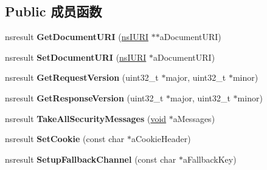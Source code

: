 \subsection*{Public 成员函数}
\begin{DoxyCompactItemize}
\item 
\mbox{\label{interfacens_i_http_channel_internal_a9989cd43cb825606751b36b1362e5ace}} 
nsresult {\bfseries Get\+Document\+U\+RI} (\hyperlink{interfacens_i_u_r_i}{ns\+I\+U\+RI} $\ast$$\ast$a\+Document\+U\+RI)
\item 
\mbox{\label{interfacens_i_http_channel_internal_a562c587c8c03b6ae214c99d3ec395212}} 
nsresult {\bfseries Set\+Document\+U\+RI} (\hyperlink{interfacens_i_u_r_i}{ns\+I\+U\+RI} $\ast$a\+Document\+U\+RI)
\item 
\mbox{\label{interfacens_i_http_channel_internal_a8a24a622ecc3d2dfa5dea63410b54fc1}} 
nsresult {\bfseries Get\+Request\+Version} (uint32\+\_\+t $\ast$major, uint32\+\_\+t $\ast$minor)
\item 
\mbox{\label{interfacens_i_http_channel_internal_a062ac7828898dd7a724ef81317a32847}} 
nsresult {\bfseries Get\+Response\+Version} (uint32\+\_\+t $\ast$major, uint32\+\_\+t $\ast$minor)
\item 
\mbox{\label{interfacens_i_http_channel_internal_a6000ec4f30903ac8fe3e17110a44a743}} 
nsresult {\bfseries Take\+All\+Security\+Messages} (\hyperlink{interfacevoid}{void} $\ast$a\+Messages)
\item 
\mbox{\label{interfacens_i_http_channel_internal_a51ebd08a39913f932c9dd7ab2e1fe9ab}} 
nsresult {\bfseries Set\+Cookie} (const char $\ast$a\+Cookie\+Header)
\item 
\mbox{\label{interfacens_i_http_channel_internal_a35c8da2507e3bd0b3a4dbc75e8a7af66}} 
nsresult {\bfseries Setup\+Fallback\+Channel} (const char $\ast$a\+Fallback\+Key)
\item 
\mbox{\label{interfacens_i_http_channel_internal_a719e93c6cf3b747ec887b650634638b4}} 
$$
\end{DoxyCompactItemize}
